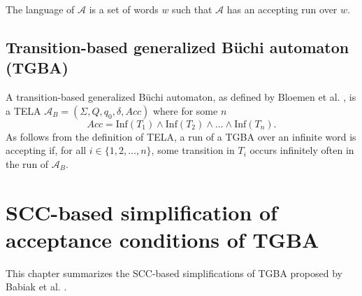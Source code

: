 \documentclass[
  digital, %
  twoside, %
  table,   %
  lof,     %
  lot,     %
]{fithesis3}
\begin{document}
The language of $\mathcal{A}$ is a set of words $w$ such that $\mathcal{A}$ has an accepting run over $w$.

\section{Transition-based generalized Büchi automaton (TGBA)}
\label{sec:tgba}
A transition-based generalized Büchi automaton, as defined by Bloemen et al. \cite{bloemen2017}, is a TELA $\mathcal{A}_B = (\Sigma, Q, q_0, \delta, Acc)$ where for some $n$
\begin{equation*}
  Acc = \text{Inf}(T_1) \wedge \text{Inf}(T_2) \wedge \dots \wedge \text{Inf}(T_n).
\end{equation*} 
As follows from the definition of TELA, a run of a TGBA over an infinite word is accepting if, for all $i \in \{1, 2, \dots, n\}$, some transition in $T_i$ occurs infinitely often in the run of $\mathcal{A}_B$. 

\chapter{SCC-based simplification of acceptance conditions of TGBA} 
\label{chap:tgba_simpl}
This chapter summarizes the SCC-based simplifications of TGBA proposed by Babiak et al. \cite{spin2013}.
\end{document}
